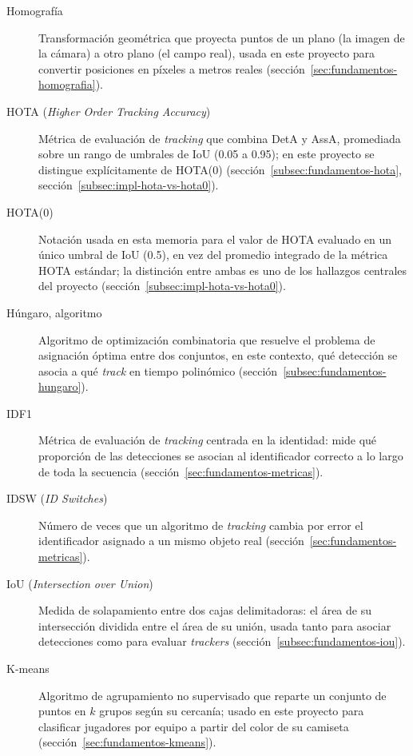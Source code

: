 \begin{description}
\item[Homografía] Transformación geométrica que proyecta puntos de un
  plano (la imagen de la cámara) a otro plano (el campo real), usada en
  este proyecto para convertir posiciones en píxeles a metros reales
  (sección~\ref{sec:fundamentos-homografia}).

\item[HOTA (\emph{Higher Order Tracking Accuracy})] Métrica de evaluación
  de \emph{tracking} que combina DetA y AssA, promediada sobre un rango de
  umbrales de IoU (0.05 a 0.95); en este proyecto se distingue
  explícitamente de HOTA(0) (sección~\ref{subsec:fundamentos-hota},
  sección~\ref{subsec:impl-hota-vs-hota0}).

\item[HOTA(0)] Notación usada en esta memoria para el valor de HOTA
  evaluado en un único umbral de IoU (0.5), en vez del promedio integrado
  de la métrica HOTA estándar; la distinción entre ambas es uno de los
  hallazgos centrales del proyecto
  (sección~\ref{subsec:impl-hota-vs-hota0}).

\item[Húngaro, algoritmo] Algoritmo de optimización combinatoria que
  resuelve el problema de asignación óptima entre dos conjuntos, en este
  contexto, qué detección se asocia a qué \emph{track} en tiempo
  polinómico (sección~\ref{subsec:fundamentos-hungaro}).

\item[IDF1] Métrica de evaluación de \emph{tracking} centrada en la
  identidad: mide qué proporción de las detecciones se asocian al
  identificador correcto a lo largo de toda la secuencia
  (sección~\ref{sec:fundamentos-metricas}).

\item[IDSW (\emph{ID Switches})] Número de veces que un algoritmo de
  \emph{tracking} cambia por error el identificador asignado a un mismo
  objeto real (sección~\ref{sec:fundamentos-metricas}).

\item[IoU (\emph{Intersection over Union})] Medida de solapamiento entre
  dos cajas delimitadoras: el área de su intersección dividida entre el
  área de su unión, usada tanto para asociar detecciones como para
  evaluar \emph{trackers} (sección~\ref{subsec:fundamentos-iou}).

\item[K-means] Algoritmo de agrupamiento no supervisado que reparte un
  conjunto de puntos en $k$ grupos según su cercanía; usado en este
  proyecto para clasificar jugadores por equipo a partir del color de su
  camiseta (sección~\ref{sec:fundamentos-kmeans}).


\end{description}
